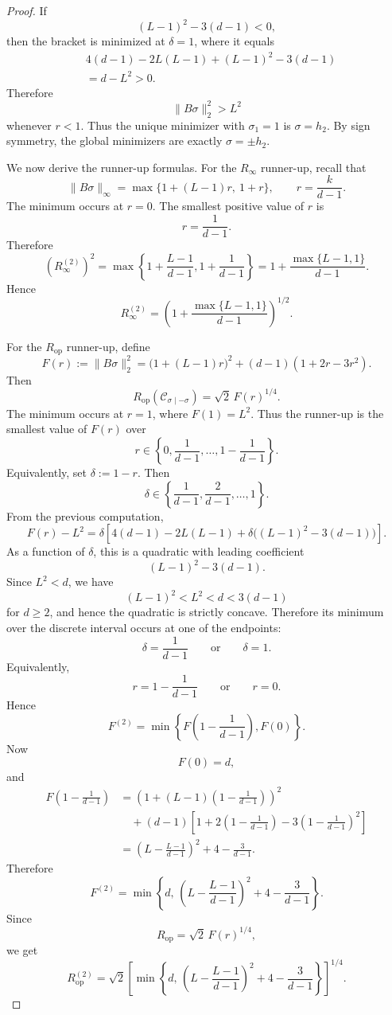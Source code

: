 \documentclass[10pt,a4paper]{amsart}
\begin{document}
\begin{proof}
If
\[
(L-1)^2-3(d-1)<0,
\]
then the bracket is minimized at $\delta=1$, where it equals
\[
\begin{aligned}
&4(d-1)-2L(L-1)+(L-1)^2-3(d-1)
\\
&=
d-L^2
>
0.
\end{aligned}
\]
Therefore
\[
\|B\sigma\|_2^2>L^2
\]
whenever $r<1$. Thus the unique minimizer with $\sigma_1=1$ is $\sigma=h_2$. By sign symmetry,
the global minimizers are exactly $\sigma=\pm h_2$.

We now derive the runner-up formulas. For the $R_\infty$ runner-up, recall that
\[
\|B\sigma\|_\infty
=
\max\{1+(L-1)r,\ 1+r\},
\qquad
r=\frac{k}{d-1}.
\]
The minimum occurs at $r=0$. The smallest positive value of $r$ is
\[
r=\frac1{d-1}.
\]
Therefore
\[
\left(R_\infty^{(2)}\right)^2
=
\max\left\{
1+\frac{L-1}{d-1},
1+\frac1{d-1}
\right\}
=
1+\frac{\max\{L-1,1\}}{d-1}.
\]
Hence
\[
R_\infty^{(2)}
=
\left(
1+\frac{\max\{L-1,1\}}{d-1}
\right)^{1/2}.
\]

For the $R_{\mathrm{op}}$ runner-up, define
\[
F(r):=\|B\sigma\|_2^2
=
\bigl(1+(L-1)r\bigr)^2
+
(d-1)(1+2r-3r^2).
\]
Then
\[
R_{\mathrm{op}}(\mathcal C_{\sigma\mid-\sigma})
=
\sqrt2\,F(r)^{1/4}.
\]
The minimum occurs at $r=1$, where $F(1)=L^2$.
Thus the runner-up is the smallest value of $F(r)$ over
\[
r\in
\left\{
0,\frac1{d-1},\dots,1-\frac1{d-1}
\right\}.
\]
Equivalently, set $\delta:=1-r$. Then
\[
\delta\in
\left\{
\frac1{d-1},\frac2{d-1},\dots,1
\right\}.
\]
From the previous computation,
\[
F(r)-L^2
=
\delta
\left[
4(d-1)-2L(L-1)
+
\delta\bigl((L-1)^2-3(d-1)\bigr)
\right].
\]
As a function of $\delta$, this is a quadratic with leading coefficient
\[
(L-1)^2-3(d-1).
\]
Since $L^2<d$, we have
\[
(L-1)^2 < L^2 < d < 3(d-1)
\]
for $d\ge2$, and hence the quadratic is strictly concave. Therefore its minimum over the discrete interval occurs at one of the endpoints:
\[
\delta=\frac1{d-1}
\qquad\text{or}\qquad
\delta=1.
\]
Equivalently,
\[
r=1-\frac1{d-1}
\qquad\text{or}\qquad
r=0.
\]
Hence
\[
F^{(2)}
=
\min\left\{
F\left(1-\frac1{d-1}\right),
F(0)
\right\}.
\]
Now
\[
F(0)=d,
\]
and
\[
\begin{aligned}
F\left(1-\frac1{d-1}\right)
&=
\left(
1+(L-1)\left(1-\frac1{d-1}\right)
\right)^2
\\
&\quad+
(d-1)
\left[
1+2\left(1-\frac1{d-1}\right)
-
3\left(1-\frac1{d-1}\right)^2
\right]
\\
&=
\left(
L-\frac{L-1}{d-1}
\right)^2
+
4-\frac{3}{d-1}.
\end{aligned}
\]
Therefore
\[
F^{(2)}
=
\min\left\{
d,\,
\left(
L-\frac{L-1}{d-1}
\right)^2
+
4-\frac{3}{d-1}
\right\}.
\]
Since
\[
R_{\mathrm{op}}=\sqrt2\,F(r)^{1/4},
\]
we get
\[
R_{\mathrm{op}}^{(2)}
=
\sqrt2
\left[
\min\left\{
d,\,
\left(
L-\frac{L-1}{d-1}
\right)^2
+
4-\frac{3}{d-1}
\right\}
\right]^{1/4}.
\]


\end{proof}
\end{document}
